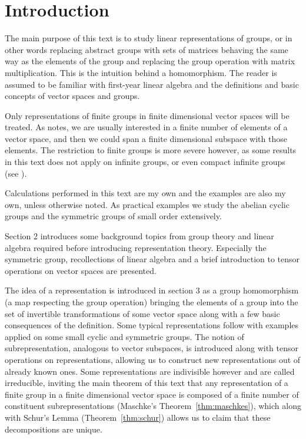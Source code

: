 \clearpage{\thispagestyle{empty}}
\section{Introduction}

	The main purpose of this text is to study linear representations of groups, or in other words replacing abstract groups with sets of matrices behaving the same way as the elements of the group and replacing the group operation with matrix multiplication. This is the intuition behind a homomorphism. The reader is assumed to be familiar with first-year linear algebra and the definitions and basic concepts of vector spaces and groups.
	
	Only representations of finite groups in finite dimensional vector spaces will be treated. As \cite[Sect.1.1.]{Serre} notes, we are usually interested in a finite number of elements of a vector space, and then we could span a finite dimensional subspace with those elements. The restriction to finite groups is more severe however, as some results in this text does not apply on infinite groups, or even compact infinite groups (see \cite{FultonHarris, Serre}). 
	
	Calculations performed in this text are my own and the examples are also my own, unless otherwise noted. As practical examples we study the abelian cyclic groups and the symmetric groups of small order extensively.
	
	Section 2 introduces some background topics from group theory and linear algebra required before introducing representation theory. Especially the symmetric group, recollections of linear algebra and a brief introduction to tensor operations on vector spaces are presented.
	
	The idea of a representation is introduced in section 3 as a group homomorphism (a map respecting the group operation) bringing the elements of a group into the set of invertible transformations of some vector space along with a few basic consequences of the definition. Some typical representations follow with examples applied on some small cyclic and symmetric groups. The notion of subrepresentation, analogous to vector subspaces, is introduced along with tensor operations on representations, allowing us to construct new representations out of already known ones. Some representations are indivisible however and are called irreducible, inviting the main theorem of this text that any representation of a finite group in a finite dimensional vector space is composed of a finite number of constituent subrepresentations (Maschke's Theorem~\ref{thm:maschkes}), which along with Schur's Lemma (Theorem~\ref{thm:schur})  allows us to claim that these decompositions are unique.
	
